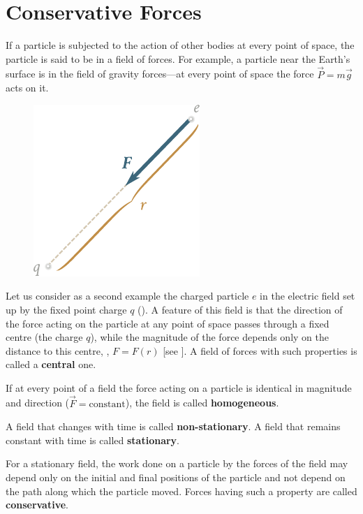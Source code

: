 \section{Conservative Forces}\label{sec:3_4}

If a particle is subjected to the action of other bodies at every point of space, the particle is said to be in a field of forces. For example, a particle near the Earth's surface is in the field of gravity forces---at every point of space the force $\vec{P}=m\vec{g}$ acts on it.

\begin{figure}[t]
	\begin{center}
		\includegraphics[scale=1]{figures/ch_03/fig_3_4.pdf}
		\caption[]{}
		\label{fig:3_4}
	\end{center}
	\vspace{-0.7cm}
\end{figure}

Let us consider as a second example the charged particle $e$ in the electric field set up by the fixed point charge $q$ (). A feature of this field is that the direction of the force acting on the particle at any point of space passes through a fixed centre (the charge $q$), while the magnitude of the force depends only on the distance to this centre, \ie, $F=F(r)$ [see ]. A field of forces with such properties is called a \textbf{central} one.

If at every point of a field the force acting on a particle is identical in magnitude and direction ($\vec{F}=\text{constant}$), the field is called \textbf{homogeneous}.

A field that changes with time is called \textbf{non-stationary}. A field that remains constant with time is called \textbf{stationary}.

For a stationary field, the work done on a particle by the forces of the field may depend only on the initial and final positions of the particle and not depend on the path along which the particle moved. Forces having such a property are called \textbf{conservative}.

